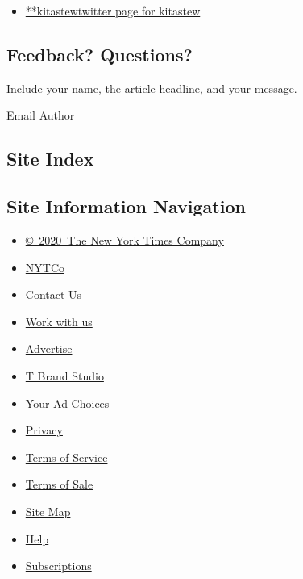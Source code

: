 \begin{itemize}
\tightlist
\item
  \href{https://twitter.com/kitastew}{**kitastewtwitter page for
  kitastew}
\end{itemize}

\hypertarget{feedback-questions}{%
\subsection{Feedback? Questions?}\label{feedback-questions}}

Include your name, the article headline, and your message.

Email Author

\hypertarget{site-index}{%
\subsection{Site Index}\label{site-index}}

\hypertarget{site-information-navigation}{%
\subsection{Site Information
Navigation}\label{site-information-navigation}}

\begin{itemize}
\tightlist
\item
  \href{https://help.nytimes3xbfgragh.onion/hc/en-us/articles/115014792127-Copyright-notice}{©~2020~The
  New York Times Company}
\end{itemize}

\begin{itemize}
\tightlist
\item
  \href{https://www.nytco.com/}{NYTCo}
\item
  \href{https://help.nytimes3xbfgragh.onion/hc/en-us/articles/115015385887-Contact-Us}{Contact
  Us}
\item
  \href{https://www.nytco.com/careers/}{Work with us}
\item
  \href{https://nytmediakit.com/}{Advertise}
\item
  \href{http://www.tbrandstudio.com/}{T Brand Studio}
\item
  \href{https://www.nytimes3xbfgragh.onion/privacy/cookie-policy\#how-do-i-manage-trackers}{Your
  Ad Choices}
\item
  \href{https://www.nytimes3xbfgragh.onion/privacy}{Privacy}
\item
  \href{https://help.nytimes3xbfgragh.onion/hc/en-us/articles/115014893428-Terms-of-service}{Terms
  of Service}
\item
  \href{https://help.nytimes3xbfgragh.onion/hc/en-us/articles/115014893968-Terms-of-sale}{Terms
  of Sale}
\item
  \href{https://spiderbites.nytimes3xbfgragh.onion}{Site Map}
\item
  \href{https://help.nytimes3xbfgragh.onion/hc/en-us}{Help}
\item
  \href{https://www.nytimes3xbfgragh.onion/subscription?campaignId=37WXW}{Subscriptions}
\end{itemize}
